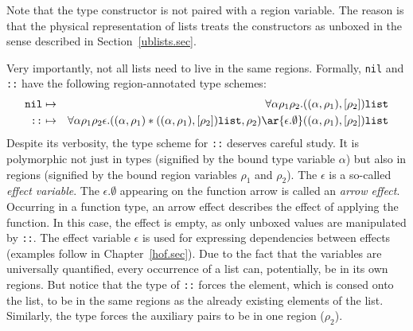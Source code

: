 \documentclass[12pt]{book}
\begin{document}
Note that the  type constructor is not paired with a region variable.
The reason is that the physical representation of lists treats the constructors
as unboxed in the sense described in Section~\ref{ublists.sec}.

Very importantly, not all lists need to live in the same regions.
Formally, {\tt nil} and {\tt ::} have the following region-annotated type schemes:
\begin{eqnarray*}
\boxml{nil} & \mapsto & \forall\alpha\rho_1\rho_2.((\alpha,\rho_1),[\rho_2])\boxml{list}\\
\boxml{::}  & \mapsto & \forall\alpha\rho_1\rho_2\epsilon.((\alpha,\rho_1)\ast((\alpha,\rho_1),[\rho_2])\boxml{list},\rho_2)
\ar{\epsilon.\emptyset} ((\alpha,\rho_1),[\rho_2])\boxml{list}
\end{eqnarray*}
Despite its verbosity, 
the type scheme for {\tt ::} deserves careful study. It is polymorphic not just in types
(signified by the bound type variable $\alpha$) but also in  regions (signified by the 
bound region variables $\rho_1$ and $\rho_2$). The $\epsilon$ is a so-called 
%
{\em effect variable}. 
The $\epsilon.\emptyset$ appearing on the function arrow is called an 
%
{\em arrow effect}.
Occurring in a function type, an arrow effect describes the effect of applying the function.
In this case, the effect is empty, as only unboxed values are manipulated by {\tt ::}. The effect variable $\epsilon$ 
is used for expressing dependencies between effects (examples follow in Chapter~\ref{hof.sec}). Due to the fact that 
the variables are universally quantified, every occurrence of a list can, potentially, be in its own regions. But notice 
that the type of {\tt ::} forces the element, which is consed onto the list, to be in the same regions 
as the already existing elements of the list. Similarly, the type forces the auxiliary pairs to be in
one region ($\rho_2$).
\end{document}
